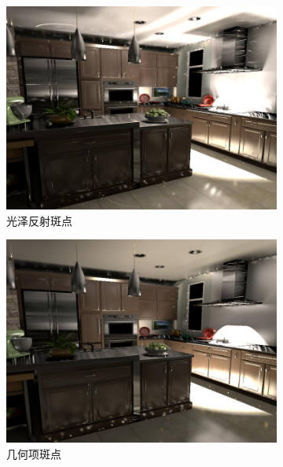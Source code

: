 \begin{figure}
\begin{fullwidth}
	\begin{subfigure}[b]{0.33\thewidth}
		\includegraphics[width=1.0\textwidth]{figures/ir/vsl-glossy-spikes}
		\caption{光泽反射斑点}
	\end{subfigure}
	\begin{subfigure}[b]{0.33\thewidth}
		\includegraphics[width=1.0\textwidth]{figures/ir/vsl-g-spikes}
		\caption{几何项斑点}
	\end{subfigure}
	\begin{subfigure}[b]{0.33\thewidth}

\end{subfigure}
\end{fullwidth}
\end{figure}
